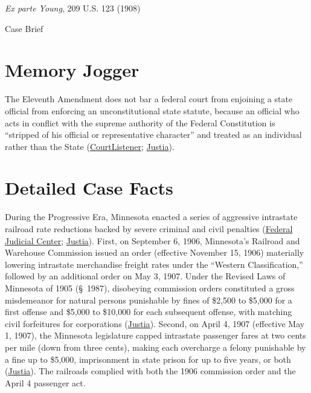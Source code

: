 \documentclass[12pt]{article}
\begin{document}
\begin{center}
{\LARGE \textit{Ex parte Young}, 209 U.S. 123 (1908)\par}
\vspace{0.8em}
{\large Case Brief\par}
\end{center}
\vspace{1em}

\section{Memory Jogger}

The Eleventh Amendment does not bar a federal court from enjoining a state official from enforcing an unconstitutional state statute, because an official who acts in conflict with the supreme authority of the Federal Constitution is ``stripped of his official or representative character'' and treated as an individual rather than the State (\href{https://www.courtlistener.com/opinion/96819/ex-parte-young/}{CourtListener}; \href{https://supreme.justia.com/cases/federal/us/209/123/}{Justia}).

\section{Detailed Case Facts}

During the Progressive Era, Minnesota enacted a series of aggressive intrastate railroad rate reductions backed by severe criminal and civil penalties (\href{https://www.fjc.gov/history/cases/cases-that-shaped-the-federal-courts/ex-parte-young}{Federal Judicial Center}; \href{https://supreme.justia.com/cases/federal/us/209/123/}{Justia}). First, on September 6, 1906, Minnesota's Railroad and Warehouse Commission issued an order (effective November 15, 1906) materially lowering intrastate merchandise freight rates under the ``Western Classification,'' followed by an additional order on May 3, 1907. Under the Revised Laws of Minnesota of 1905 (\S~1987), disobeying commission orders constituted a gross misdemeanor for natural persons punishable by fines of \$2,500 to \$5,000 for a first offense and \$5,000 to \$10,000 for each subsequent offense, with matching civil forfeitures for corporations (\href{https://supreme.justia.com/cases/federal/us/209/123/}{Justia}). Second, on April 4, 1907 (effective May 1, 1907), the Minnesota legislature capped intrastate passenger fares at two cents per mile (down from three cents), making each overcharge a felony punishable by a fine up to \$5,000, imprisonment in state prison for up to five years, or both (\href{https://supreme.justia.com/cases/federal/us/209/123/}{Justia}). The railroads complied with both the 1906 commission order and the April 4 passenger act.
\end{document}

